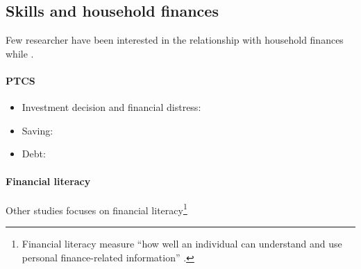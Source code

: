 \documentclass[a4paper, 11pt, onecolumn]{article}
\begin{document}
\subsection{Skills and household finances}

Few researcher have been interested in the relationship with household finances while  \citep{Campbell2006}.


\paragraph{PTCS}
\begin{itemize}
\item Investment decision and financial distress: \citep{Nga2013} \citep{Pinjisakikool2017b} \citep{Bucciol2017} \citep{Agarwal2013} \citep{Parise2019}
\item Saving: \citep{CobbClark2016} \citep{Gerhard2018}
\item Debt: \citep{Forlicz2019} \citep{Silva2018} \citep{Brown2014}
\end{itemize}


\paragraph{Financial literacy}
Other studies focuses on financial literacy\footnote{Financial literacy measure ``how well an individual can understand and use personal finance-related information'' \citep{Huston2010}.} \citep{Hastings2013} \citep{Gaurav2012} \citep{Klapper2012}





\end{document}

